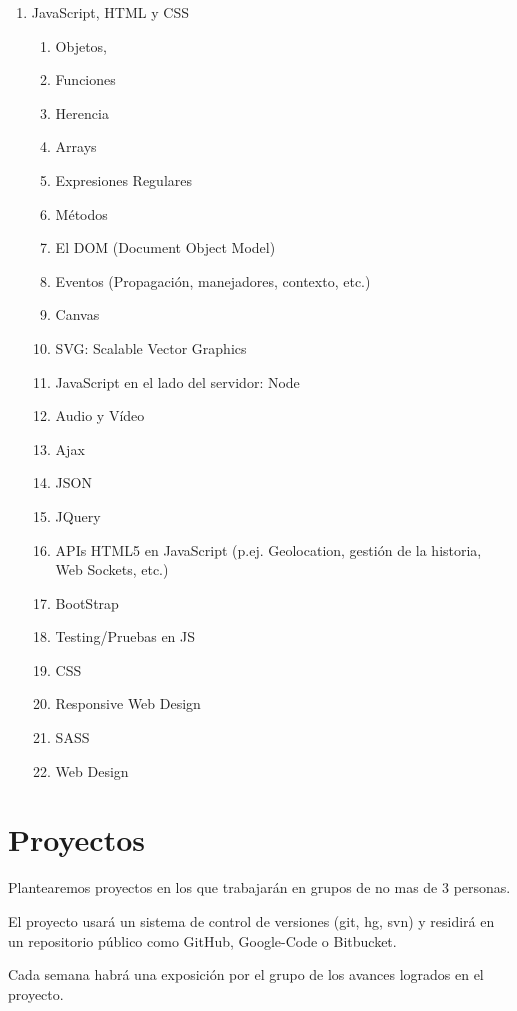 \documentclass[11pt,a4paper]{article}
\begin{document}
\begin{enumerate}
\item JavaScript, HTML y CSS
  \begin{enumerate}
  \item Objetos, 
  \item Funciones 
  \item Herencia
  \item Arrays
  \item Expresiones Regulares
  \item Métodos
  \item El DOM (Document Object Model)
  \item Eventos (Propagación, manejadores, contexto, etc.)
  \item Canvas
  \item SVG: Scalable Vector Graphics
  \item JavaScript en el lado del servidor: Node
  \item Audio y Vídeo
  \item Ajax
  \item JSON
  \item JQuery
  \item APIs HTML5 en JavaScript (p.ej. Geolocation, gestión de la historia, Web Sockets, etc.)
  \item BootStrap
  \item Testing/Pruebas en JS
  \item CSS
  \item Responsive Web Design
  \item SASS
  \item Web Design
  \end{enumerate}
\end{enumerate}

\section{Proyectos}
Plantearemos proyectos en los que trabajarán en grupos de no mas de 3 personas.

El proyecto usará un sistema de control de versiones (git, hg, svn) y 
residirá en un repositorio público como GitHub, Google-Code o Bitbucket.

Cada semana habrá una exposición por el grupo de los avances logrados en el proyecto.
\end{document}
